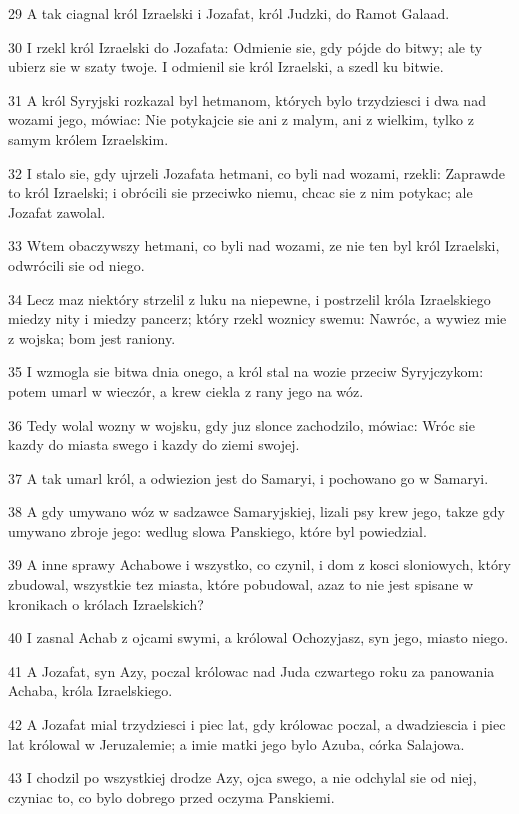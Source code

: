 \par 29 A tak ciagnal król Izraelski i Jozafat, król Judzki, do Ramot Galaad.
\par 30 I rzekl król Izraelski do Jozafata: Odmienie sie, gdy pójde do bitwy; ale ty ubierz sie w szaty twoje. I odmienil sie król Izraelski, a szedl ku bitwie.
\par 31 A król Syryjski rozkazal byl hetmanom, których bylo trzydziesci i dwa nad wozami jego, mówiac: Nie potykajcie sie ani z malym, ani z wielkim, tylko z samym królem Izraelskim.
\par 32 I stalo sie, gdy ujrzeli Jozafata hetmani, co byli nad wozami, rzekli: Zaprawde to król Izraelski; i obrócili sie przeciwko niemu, chcac sie z nim potykac; ale Jozafat zawolal.
\par 33 Wtem obaczywszy hetmani, co byli nad wozami, ze nie ten byl król Izraelski, odwrócili sie od niego.
\par 34 Lecz maz niektóry strzelil z luku na niepewne, i postrzelil króla Izraelskiego miedzy nity i miedzy pancerz; który rzekl woznicy swemu: Nawróc, a wywiez mie z wojska; bom jest raniony.
\par 35 I wzmogla sie bitwa dnia onego, a król stal na wozie przeciw Syryjczykom: potem umarl w wieczór, a krew ciekla z rany jego na wóz.
\par 36 Tedy wolal wozny w wojsku, gdy juz slonce zachodzilo, mówiac: Wróc sie kazdy do miasta swego i kazdy do ziemi swojej.
\par 37 A tak umarl król, a odwiezion jest do Samaryi, i pochowano go w Samaryi.
\par 38 A gdy umywano wóz w sadzawce Samaryjskiej, lizali psy krew jego, takze gdy umywano zbroje jego: wedlug slowa Panskiego, które byl powiedzial.
\par 39 A inne sprawy Achabowe i wszystko, co czynil, i dom z kosci sloniowych, który zbudowal, wszystkie tez miasta, które pobudowal, azaz to nie jest spisane w kronikach o królach Izraelskich?
\par 40 I zasnal Achab z ojcami swymi, a królowal Ochozyjasz, syn jego, miasto niego.
\par 41 A Jozafat, syn Azy, poczal królowac nad Juda czwartego roku za panowania Achaba, króla Izraelskiego.
\par 42 A Jozafat mial trzydziesci i piec lat, gdy królowac poczal, a dwadziescia i piec lat królowal w Jeruzalemie; a imie matki jego bylo Azuba, córka Salajowa.
\par 43 I chodzil po wszystkiej drodze Azy, ojca swego, a nie odchylal sie od niej, czyniac to, co bylo dobrego przed oczyma Panskiemi.

